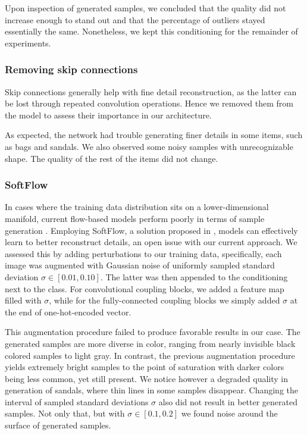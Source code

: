 \documentclass[final]{cvpr}
\begin{document}
Upon inspection of generated samples, we concluded that the quality did not increase enough to stand out and that the percentage of outliers stayed essentially the same. Nonetheless, we kept this conditioning for the remainder of experiments.

\subsubsection{Removing skip connections}
Skip connections generally help with fine detail reconstruction, as the latter can be lost through repeated convolution operations. Hence we removed them from the model to assess their importance in our architecture.

As expected, the network had trouble generating finer details in some items, such as bags and sandals. We also observed some noisy samples with unrecognizable shape. The quality of the rest of the items did not change.

\subsubsection{SoftFlow}\label{sec:experiment_softflow}
In cases where the training data distribution sits on a lower-dimensional manifold, current flow-based models perform poorly in terms of sample generation \cite{softflow}. Employing SoftFlow, a solution proposed in \cite{softflow}, models can effectively learn to better reconstruct details, an open issue with our current approach. We assessed this by adding perturbations to our training data, specifically, each image was augmented with Gaussian noise of uniformly sampled standard deviation $\sigma \in [0.01, 0.10]$. The latter was then appended to the conditioning next to the class. For convolutional coupling blocks, we added a feature map filled with $\sigma$, while for the fully-connected coupling blocks we simply added $\sigma$ at the end of one-hot-encoded vector.

This augmentation procedure failed to produce favorable results in our case. The generated samples are more diverse in color, ranging from nearly invisible black colored samples to light gray. In contrast, the previous augmentation procedure yields extremely bright samples to the point of saturation with darker colors being less common, yet still present. We notice however a degraded quality in generation of sandals, where thin lines in some samples disappear. Changing the interval of sampled standard deviations $\sigma$ also did not result in better generated samples. Not only that, but with $\sigma \in [0.1, 0.2]$ we found noise around the surface of generated samples.
\end{document}

